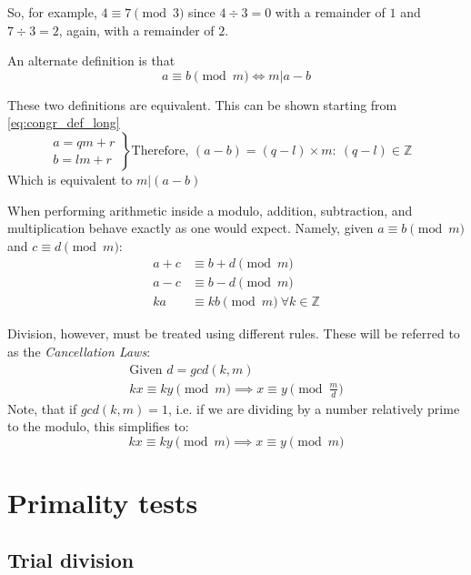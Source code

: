 \documentclass[12pt, titlepage]{article}
\begin{document}
    So, for example, $4 \equiv 7 \pmod{3}$ since $4 \div 3 = 0$ with a remainder of $1$ and
    $7 \div 3 = 2$, again, with a remainder of $2$.

    An alternate definition is that
    \begin{equation*}
        a \equiv b \pmod{m} \iff m | a-b
    \end{equation*}

    These two definitions are equivalent. This can be shown starting from 
    \eqref{eq:congr_def_long}
%
    \begin{equation*}
        \left. 
            \begin{aligned}
                a = qm + r\\ 
                b = lm + r
            \end{aligned}
        \right\}
        \text{Therefore, }
        (a - b) = (q-l)\times m :\: (q-l) \in \mathbb{Z}\quad
    \end{equation*}
    Which is equivalent to $m | (a-b)$

    When performing arithmetic inside a modulo, addition, subtraction, and multiplication
    behave exactly as one would expect. Namely, given
    $a\equiv b\pmod{m}$ and $c\equiv d\pmod{m}$:
    \begin{align*}
        a + c &\equiv b + d \pmod{m}\\
        a - c &\equiv b - d \pmod{m}\\
        ka 	  &\equiv kb \pmod{m}\ \forall k \in \mathbb{Z} 
    \end{align*}

    Division, however, must be treated using different rules. These will be referred to as
    the \emph{Cancellation Laws}:
    \begin{gather*}
        \text{Given } d = gcd(k, m)\\
        kx \equiv ky \pmod{m} \implies x \equiv y \pmod{\frac{m}{d}}
    \end{gather*}
    Note, that if $gcd(k, m) = 1$, i.e. if we are dividing by a number relatively prime to
    the modulo, this simplifies to:
    \begin{equation*}
        kx \equiv ky \pmod{m} \implies x \equiv y \pmod{m}
    \end{equation*}


\section{Primality tests}
    \subsection{Trial division}
\end{document}
